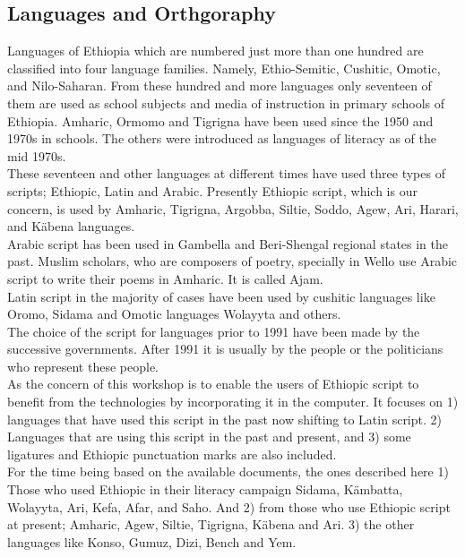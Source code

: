 
\subsection*{Languages and Orthgoraphy}

Languages of Ethiopia which are numbered just more than one hundred are
classified into four language families.  Namely, Ethio-Semitic, Cushitic,
Omotic, and Nilo-Saharan.   From these hundred and more languages only 
seventeen of them are used as school subjects and media of instruction in 
primary schools of Ethiopia.  Amharic, Ormomo and Tigrigna have been used
since the 1950 and 1970s in schools.  The others were introduced as languages
of literacy as of the mid 1970s.\\

These seventeen and other languages at different times have used three
types of scripts; Ethiopic, Latin and Arabic.  Presently Ethiopic script,
which is our concern, is used by Amharic, Tigrigna, Argobba, Siltie, Soddo, 
Agew, Ari, Harari, and K\"{a}bena languages.\\

Arabic script has been used in Gambella and Beri-Shengal regional states in 
the past.  Muslim scholars, who are composers of poetry, specially in Wello
use Arabic script to write their poems in Amharic.  It is called Ajam.\\

Latin script in the majority of cases have been used by cushitic languages
like Oromo, Sidama and Omotic languages Wolayyta and others.\\

The choice of the script for languages prior to 1991 have been made by the
successive governments.  After 1991 it is usually by the people or the
politicians who represent these people.\\

As the concern of this workshop is to enable the users of Ethiopic script to 
benefit from the technologies by incorporating it in the computer.  It
focuses on 1) languages that have used this script in the past now shifting
to Latin script.  2) Languages that are using this script in the past and
present, and 3) some ligatures and Ethiopic punctuation marks are also 
included.\\

For the time being based on the available documents, the ones described
here 1) Those who used Ethiopic in their literacy campaign Sidama, 
K\"{a}mbatta, Wolayyta, Ari, Kefa, Afar, and Saho.  And 2) from those who use
Ethiopic script at present; Amharic, Agew, Siltie, Tigrigna, K\"{a}bena and
Ari. 3) the other languages like Konso, Gumuz, Dizi, Bench and Yem.\\

